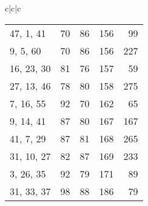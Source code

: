 \documentclass{acmsmalltr}
\newcommand{\xst}[3]{#1, #2, #3}
\begin{document}
\begin{sidewaystable}
{\begin{tabular}{c|c|c}
\begin{tabular}{l|rr|r|r}
\xst{47}{1}{41} & 70 & 86 & 156 & 99\\
\xst{9}{5}{60} & 70 & 86 & 156 & 227\\
\xst{16}{23}{30} & 81 & 76 & 157 & 59\\
\xst{27}{13}{46} & 78 & 80 & 158 & 275\\
\xst{7}{16}{55} & 92 & 70 & 162 & 65\\
\xst{9}{14}{41} & 87 & 80 & 167 & 167\\
\xst{41}{7}{29} & 87 & 81 & 168 & 265\\
\xst{31}{10}{27} & 82 & 87 & 169 & 233\\
\xst{3}{26}{35} & 92 & 79 & 171 & 89\\
\xst{31}{33}{37} & 98 & 88 & 186 & 79\\
\end{tabular}
\end{tabular}}
\end{sidewaystable}
\end{document}
